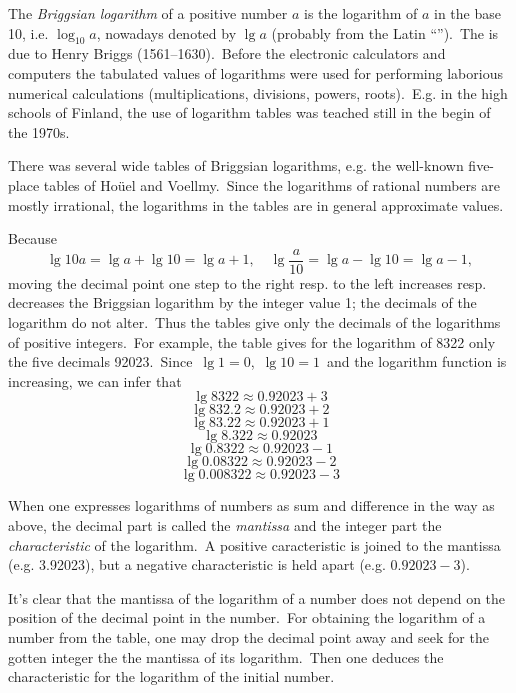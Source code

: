 \documentclass[12pt]{article}
\theoremstyle{definition}
\begin{document}
  
  

The {\em Briggsian logarithm} of a positive number $a$ is the logarithm of $a$ in the base 10, i.e. $\log_{10}{a}$, nowadays denoted by $\lg{a}$ (probably from the Latin ``'').\, The  is due to Henry Briggs (1561--1630).\, Before the electronic calculators and computers the tabulated values of logarithms were used for performing laborious numerical calculations (multiplications, divisions, powers, roots).\, E.g. in the high schools of Finland, the use of logarithm tables was teached still in the begin of the 1970s.

There was several wide tables of Briggsian logarithms, e.g. the well-known five-place tables of Ho\"uel and Voellmy.\, Since the logarithms of rational numbers are mostly irrational, the logarithms in the tables are in general approximate values.

Because
$$\lg{10a} = \lg{a}+\lg{10} = \lg{a}+1, 
\quad \lg\frac{a}{10} = \lg{a}-\lg{10} = \lg{a}-1,$$
moving the decimal point one step to the right resp. to the left increases resp. decreases the Briggsian logarithm by the integer value 1; the decimals of the logarithm do not alter.\, Thus the tables give only the decimals of the logarithms of positive integers.\, For example, the table gives for the logarithm of 8322 only the five decimals 92023.\, Since\, $\lg{1} = 0$,\,  $\lg{10} = 1$\, and the logarithm function is increasing, we can infer that
$$\lg{8322} \approx 0.92023\!+\!3$$
$$\lg{832.2} \approx 0.92023\!+\!2$$
$$\lg{83.22} \approx 0.92023\!+\!1$$
$$\lg{8.322} \approx 0.92023$$
$$\lg{0.8322} \approx 0.92023\!-\!1$$
$$\lg{0.08322} \approx 0.92023\!-\!2$$
$$\lg{0.008322} \approx 0.92023\!-\!3$$

When one expresses logarithms of numbers as sum and difference in the way as above, the decimal part is called the {\em mantissa} and the integer part the {\em characteristic} of the logarithm.\, A positive caracteristic is joined to the mantissa (e.g. 3.92023), but a negative characteristic is held apart (e.g. $0.92023\!-\!3$).

It's clear that the mantissa of the logarithm of a number does not depend on the position of the decimal point in the number.\, For obtaining the logarithm of a number from the table, one may drop the decimal point away and seek for the gotten integer the the mantissa of its logarithm.\, Then one deduces the characteristic for the logarithm of the initial number.\\
\end{document}
